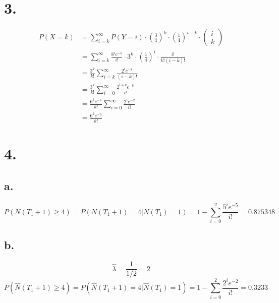 \documentclass[11pt]{article}
\begin{document}
\section*{3.}
\begin{equation*}
    \begin{aligned}
        P(X=k) &=  \sum_{i=k}^\infty P(Y=i) \cdot \left(\frac{3}{4} \right)^k \cdot \left(\frac{1}{4} \right)^{i-k} \cdot 
        \begin{pmatrix}
            i \\
            k
        \end{pmatrix} \\
        &= \sum_{i=k}^\infty \frac{8^i e^{-8}}{i!} \cdot 3^k \cdot \left(\frac{1}{4}\right)^i \cdot \frac{i!}{k!(i-k)! } \\
        &= \frac{3^k}{k!}\sum_{i=k}^\infty \frac{2^i e^{-8}}{(i-k)!} \\
        &= \frac{3^k}{k!}\sum_{i=0}^\infty \frac{2^{i+k} e^{-8}}{i!} \\
        &= \frac{6^k e^{-6}}{k!}\sum_{i=0}^\infty \frac{2^i e^{-2}}{i!} \\
        &= \frac{6^k e^{-6}}{k!}
    \end{aligned}
\end{equation*}
\pagebreak
\section*{4.}
\subsection*{a.}
\[
    P(N(T_1 + 1) \ge 4) =  P(N(T_1 + 1) = 4 |N(T_1)=1) = 1 - \sum_{i=0}^2 \frac{5^i e^{-5}}{i!} = 0.875348
\]
\subsection*{b.}
\[
    \hat{\lambda} = \frac{1}{1/2} = 2    
\]
\[
    P(\hat{N}(T_1 + 1) \ge 4) =  P(\hat{N}(T_1 + 1) = 4 |\hat{N}(T_1)=1) = 1 - \sum_{i=0}^2 \frac{2^i e^{-2}}{i!} = 0.3233  
\]
\end{document}
